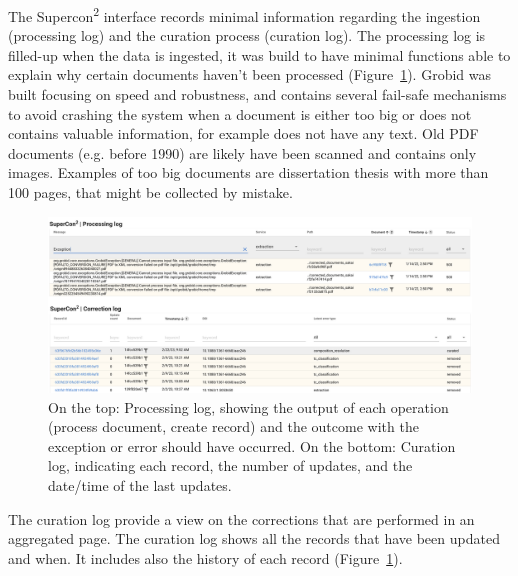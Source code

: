 \documentclass[a4paper]{article}
\begin{document}
The Supercon\textsuperscript{2} interface records minimal information regarding the ingestion (processing log) and the curation process (curation log). 
The processing log is filled-up when the data is ingested, it was build to have minimal functions able to explain why certain documents haven't been processed (Figure~\ref{fig:processing-curation-log}). 
Grobid was built focusing on speed and robustness, and contains several fail-safe mechanisms to avoid crashing the system when a document is either too big or does not contains valuable information, for example does not have any text. Old PDF documents (e.g. before 1990) are likely have been scanned and contains only images. 
Examples of too big documents are dissertation thesis with more than 100 pages, that might be collected by mistake. 


\begin{figure}[ht]
  \centering
  \includegraphics[width=1\textwidth]{images/processing-curation-log.png} 
  \caption{On the top: Processing log, showing the output of each operation (process document, create record) and the outcome with the exception or error should have occurred. On the bottom: Curation log, indicating each record, the number of updates, and the date/time of the last updates.}
  \label{fig:processing-curation-log}
\end{figure}

The curation log provide a view on the corrections that are performed in an aggregated page. 
The curation log shows all the records that have been updated and when. It includes also the history of each record (Figure~\ref{fig:processing-curation-log}).

\end{document}
